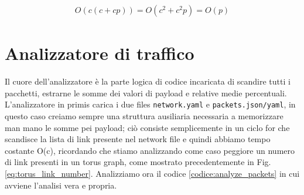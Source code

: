 \documentclass[binding=0.6cm]{sapthesis}
\begin{document}
\begin{align}
    O(c(c+cp)) = O(c^2 + c^2p) = O(p)
    \label{eq:complexity_traffic_generator}
\end{align}



\section{Analizzatore di traffico}
Il cuore dell'analizzatore è la parte logica di codice incaricata di scandire tutti i pacchetti, estrarne le somme dei valori di payload e relative medie percentuali.
L'analizzatore in primis carica i due files \texttt{network.yaml} e \texttt{packets.json/yaml}, in questo caso creiamo sempre una struttura ausiliaria necessaria a memorizzare man mano le somme pei payload; ciò 
consiste semplicemente in un ciclo for che scandisce la lista di link presente nel network file e quindi abbiamo tempo costante O(c), ricordando che stiamo
analizzando come caso peggiore un numero di link presenti in un torus graph, come mostrato precedentemente in Fig. \ref{eq:torus_link_number}.
Analizziamo ora il codice \ref{codice:analyze_packets} in cui avviene l'analisi vera e propria.
\end{document}
